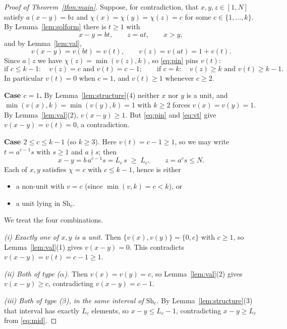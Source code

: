 \documentclass{amsart}
\theoremstyle{definition}
\newcommand{\Sh}{\mathrm{Sh}}
\begin{document}
\begin{proof}[Proof of Theorem~\ref{thm:main}]
Suppose, for contradiction, that $x,y,z\in[1,N]$ satisfy $a(x-y)=bz$ and
$\chi(x)=\chi(y)=\chi(z)=c$ for some $c\in\{1,\dots,k\}$.  By
Lemma~\ref{lem:solform} there is $t\ge1$ with
\[
  x-y=bt,\qquad z=at,\qquad x>y,
\]
and by Lemma~\ref{lem:val},
\begin{equation}\label{eq:pin}
  v(x-y)=v(bt)=v(t),\qquad v(z)=v(at)=1+v(t).
\end{equation}
Since $a\mid z$ we have $\chi(z)=\min(v(z),k)$, so \eqref{eq:pin} pins $v(t)$:
\begin{equation}\label{eq:vt}
  \text{if } c\le k-1:\quad v(z)=c \text{ and } v(t)=c-1;
  \qquad
  \text{if } c=k:\quad v(z)\ge k \text{ and } v(t)\ge k-1 .
\end{equation}
In particular $v(t)=0$ when $c=1$, and $v(t)\ge1$ whenever $c\ge2$.

\smallskip
\noindent\textbf{Case $c=1$.}  By Lemma~\ref{lem:structure}(4) neither $x$ nor
$y$ is a unit, and $\min(v(x),k)=\min(v(y),k)=1$ with $k\ge2$ forces
$v(x)=v(y)=1$.  By Lemma~\ref{lem:val}(2), $v(x-y)\ge1$.  But \eqref{eq:pin}
and \eqref{eq:vt} give $v(x-y)=v(t)=0$, a contradiction.

\smallskip
\noindent\textbf{Case $2\le c\le k-1$} (so $k\ge3$).  Here $v(t)=c-1\ge1$, so
we may write $t=a^{c-1}s$ with $s\ge1$ and $a\nmid s$; then
\begin{equation}\label{eq:mid}
  x-y=b\,a^{c-1}s=L_c\,s\;\ge\;L_c,
  \qquad z=a^{c}s\le N .
\end{equation}
Each of $x,y$ satisfies $\chi=c$ with $c\le k-1$, hence is either
\begin{itemize}
\item[($\alpha$)] a non-unit with $v=c$ (since $\min(v,k)=c<k$), or
\item[($\beta$)] a unit lying in $\Sh_c$.
\end{itemize}
We treat the four combinations.

\emph{(i) Exactly one of $x,y$ is a unit.}  Then $\{v(x),v(y)\}=\{0,c\}$ with
$c\ge1$, so Lemma~\ref{lem:val}(1) gives $v(x-y)=0$.  This contradicts
$v(x-y)=v(t)=c-1\ge1$.

\emph{(ii) Both of type ($\alpha$).}  Then $v(x)=v(y)=c$, so
Lemma~\ref{lem:val}(2) gives $v(x-y)\ge c$, contradicting $v(x-y)=c-1$.

\emph{(iii) Both of type ($\beta$), in the same interval of $\Sh_c$.}  By
Lemma~\ref{lem:structure}(3) that interval has exactly $L_c$ elements, so
$x-y\le L_c-1$, contradicting $x-y\ge L_c$ from \eqref{eq:mid}.


\end{proof}
\end{document}

